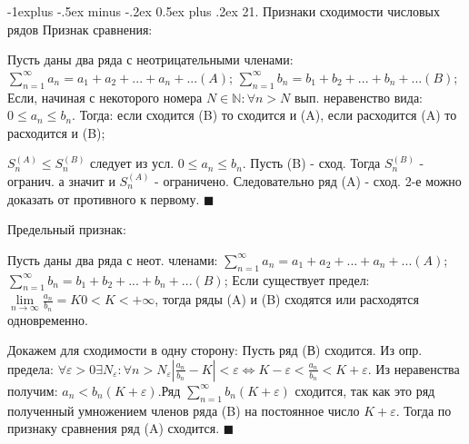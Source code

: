 \documentclass[unicode,10pt, landscape]{article}
\makeatletter
\renewcommand{\subsection}{\@startsection{subsection}{2}{0mm}%
                                {-1explus -.5ex minus -.2ex}%
                                {0.5ex plus .2ex}%
                                {\normalfont\normalsize\bfseries}}
\newenvironment{Proof} %
{\par\noindent{\bf Док-во:}} %
{\hfill$\scriptstyle\blacksquare$}
\makeatother
\begin{document}
\begin{multicols}{4}
 \subsection{21. Признаки сходимости числовых рядов}
 Признак сравнения:
 \begin{Th}
  Пусть даны два ряда с неотрицательными членами: $\sum\limits_{n=1}^{\infty} a_{n}=a_{1}+a_{2}+...+a_{n}+...    (A)$; $\sum\limits_{n=1}^{\infty} b_{n}=b_{1}+b_{2}+...+b_{n}+...    (B)$; Если, начиная с некоторого номера $N \in \mathbb{N} : \forall n > N$ вып. неравенство вида: $0\leq a_{n}\leq b_{n}$. Тогда: если сходится (B) то сходится и (A), если расходится (A) то расходится и (B);
  \begin{Proof}
   $S_n^{(A)} \leq S_n^{(B)}$ следует из усл. $0\leq a_{n}\leq b_{n}$. Пусть (B) - сход. Тогда $S_n^{(B)}$ - огранич. а значит и $S_n^{(A)}$ - ограничено. Следовательно ряд (A) - сход. 2-е можно доказать от противного к первому.
  \end{Proof}
 \end{Th}
 Предельный признак:
 \begin{Th}
  Пусть даны два ряда с неот. членами: $\sum\limits_{n=1}^{\infty} a_{n}=a_{1}+a_{2}+...+a_{n}+...    (A)$; $\sum\limits_{n=1}^{\infty} b_{n}=b_{1}+b_{2}+...+b_{n}+...    (B)$; Если существует предел: $\lim\limits_{n\rightarrow \infty } \frac{a_{n}}{b_{n}}=K      0<K< +\infty$, тогда ряды (A) и (B) сходятся или расходятся одновременно.
  \begin{Proof}
   Докажем для сходимости в одну сторону:
   Пусть ряд (В) сходится. Из опр. предела: $\forall \varepsilon >0 \exists N_{\varepsilon }:\forall n>N_{\varepsilon }\left | \frac{a_{n}}{b_{n}}-K \right |<\varepsilon \Leftrightarrow K-\varepsilon <\frac{a_{n}}{b_{n}}<K+\varepsilon$. Из неравенства получим: $a_{n}<b_{n}(K+\varepsilon )$.Ряд $\sum_{n=1}^{\infty} b_{n}(K+\varepsilon )$ сходится, так как это ряд полученный умножением членов ряда (B) на постоянное число $K+\varepsilon$. Тогда по признаку сравнения ряд (A) сходится.
  \end{Proof}
 \end{Th}

\end{multicols}
\end{document}
